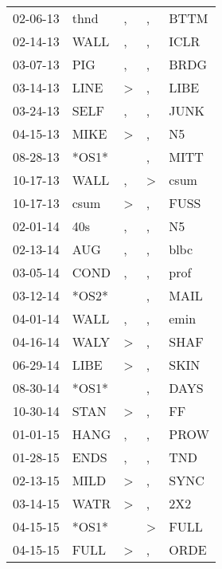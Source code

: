 \begin{supertabular}{lllll}
 02-06-13 &   thnd &                , &                , &   BTTM \\
 02-14-13 &   WALL &                , &                , &   ICLR \\
 03-07-13 &    PIG &                , &                , &   BRDG \\
 03-14-13 &   LINE &     \textgreater &                , &   LIBE \\
 03-24-13 &   SELF &                , &                , &   JUNK \\
 04-15-13 &   MIKE &     \textgreater &                , &     N5 \\
 08-28-13 &  *OS1* &                  &                , &   MITT \\
 10-17-13 &   WALL &                , &     \textgreater &   csum \\
 10-17-13 &   csum &     \textgreater &                , &   FUSS \\
 02-01-14 &    40s &                , &                , &     N5 \\
 02-13-14 &    AUG &                , &                , &   blbc \\
 03-05-14 &   COND &                , &                , &   prof \\
 03-12-14 &  *OS2* &                  &                , &   MAIL \\
 04-01-14 &   WALL &                , &                , &   emin \\
 04-16-14 &   WALY &     \textgreater &                , &   SHAF \\
 06-29-14 &   LIBE &     \textgreater &                , &   SKIN \\
 08-30-14 &  *OS1* &                  &                , &   DAYS \\
 10-30-14 &   STAN &     \textgreater &                , &     FF \\
 01-01-15 &   HANG &                , &                , &   PROW \\
 01-28-15 &   ENDS &                , &                , &    TND \\
 02-13-15 &   MILD &     \textgreater &                , &   SYNC \\
 03-14-15 &   WATR &     \textgreater &                , &    2X2 \\
 04-15-15 &  *OS1* &                  &     \textgreater &   FULL \\
 04-15-15 &   FULL &     \textgreater &                , &   ORDE \\

\end{supertabular}
